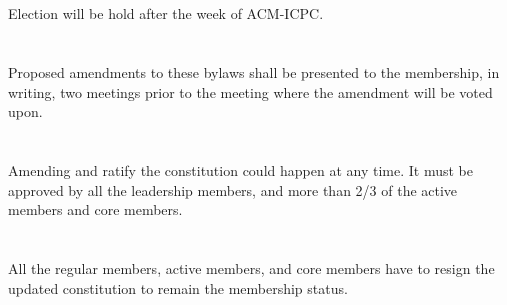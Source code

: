 \documentclass[20pt]{constitution}
\begin{document}
\section{}
Election will be hold after the week of ACM-ICPC.

\section{}
Proposed amendments to these bylaws shall be presented to the membership, 
in writing, two meetings prior to the meeting where the amendment will be voted upon.  
\section{}
Amending and ratify the constitution could happen at any time. It must be approved by all the leadership members,
and more than 2/3 of the active members and core members.
\section{}
All the regular members, active members, and core members have to resign the updated constitution
to remain the membership status.
\end{document}
